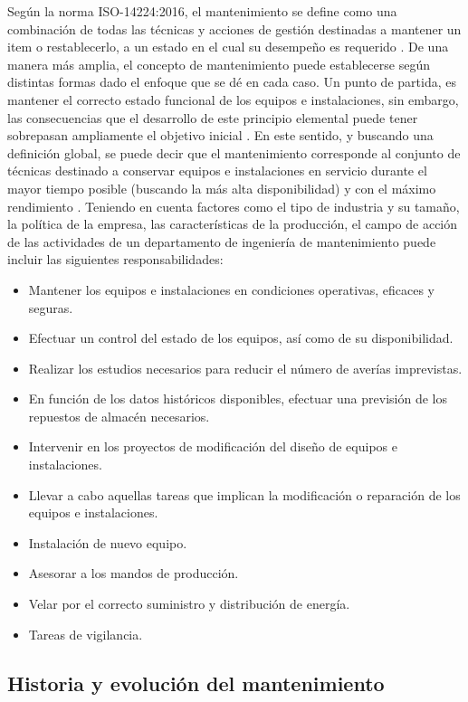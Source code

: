Según la norma ISO-14224:2016, el mantenimiento se define como una combinación de todas las técnicas y acciones de gestión destinadas a mantener un item o restablecerlo, a un estado en el cual su desempeño es requerido \citep{iso2016}. De una manera más amplia, el concepto de mantenimiento puede establecerse según distintas formas dado el enfoque que se dé en cada caso. Un punto de partida, es mantener el correcto estado funcional de los equipos e instalaciones, sin embargo, las consecuencias que el desarrollo de este principio elemental puede tener sobrepasan ampliamente el objetivo inicial \citep{gomez1998}. En este sentido, y buscando una definición global, se puede decir que el mantenimiento corresponde al conjunto de técnicas destinado a conservar equipos e instalaciones en servicio durante el mayor tiempo posible (buscando la más alta disponibilidad) y con el máximo rendimiento \citep{garcia2010}.
Teniendo en cuenta factores como el tipo de industria y su tamaño, la política de la empresa, las características de la producción, el campo de acción de las actividades de un departamento de ingeniería de mantenimiento puede incluir las siguientes responsabilidades\citep{gomez1998}: \\

\begin{itemize}
\item Mantener los equipos e instalaciones en condiciones operativas, eficaces y seguras.
\item Efectuar un control del estado de los equipos, así como de su disponibilidad.
\item Realizar los estudios necesarios para reducir el número de averías imprevistas.
\item En función de los datos históricos disponibles, efectuar una previsión de los repuestos de almacén necesarios.
\item Intervenir en los proyectos de modificación del diseño de equipos e instalaciones.
\item Llevar a cabo aquellas tareas que implican la modificación o reparación de los equipos e instalaciones.
\item Instalación de nuevo equipo.
\item Asesorar a los mandos de producción.
\item Velar por el correcto suministro y distribución de energía.
\item Tareas de vigilancia.
\end{itemize}

\subsection{Historia y evolución del mantenimiento}

